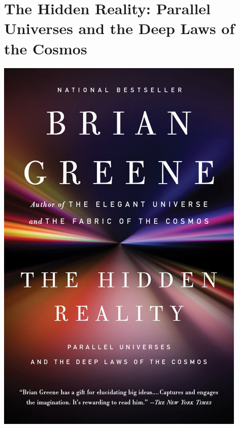 \documentclass{tufte-handout}
\makeatletter
\newcommand{\varcaption}[2][0pt]{%
  \gsetlength{\@tufte@caption@vertical@offset}{-#1}%
  \gdef\@tufte@stored@varcaption{#2}%
}
\gdef\@tufte@stored@varcaption{} %
\makeatother
\begin{document}
\section*{The Hidden Reality: Parallel Universes and the Deep Laws of the Cosmos}
\begin{marginfigure}[7\baselineskip]
   \includegraphics[width=\linewidth]{images/hidden_reality.jpg}
   \varcaption{\href{https://www.penguinrandomhouse.com/books/71272/the-hidden-reality-by-brian-greene/9780307278128/}{Publisher Link}, \href{https://www.amazon.com/Hidden-Reality-Parallel-Universes-Cosmos/dp/0307278123/}{Amazon Link}}
\end{marginfigure}
\end{document}
